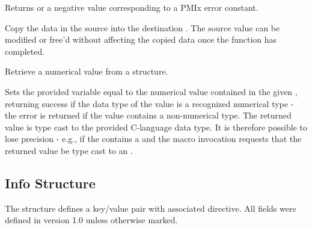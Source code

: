 Returns  or a negative value corresponding to a PMIx error constant.

\descr

Copy the data in the source  into the destination . The source value can be modified or free'd without affecting the copied data once the function has completed.


Retrieve a numerical value from a  structure.


\begin{arglist}
\end{arglist}

Sets the provided variable equal to the numerical value contained in the given , returning success if the data type of the value is a recognized numerical type - the  error is
returned if the value contains a non-numerical type. The returned value is type cast to the
provided C-language data type. It is therefore possible to lose precision - e.g., if the 
contains a  and the macro invocation requests that the returned value be type cast to an
.

\subsection{Info Structure}
\label{chap:struct:info}

The  structure defines a key/value pair with associated directive. All fields were defined in version 1.0 unless otherwise marked.


